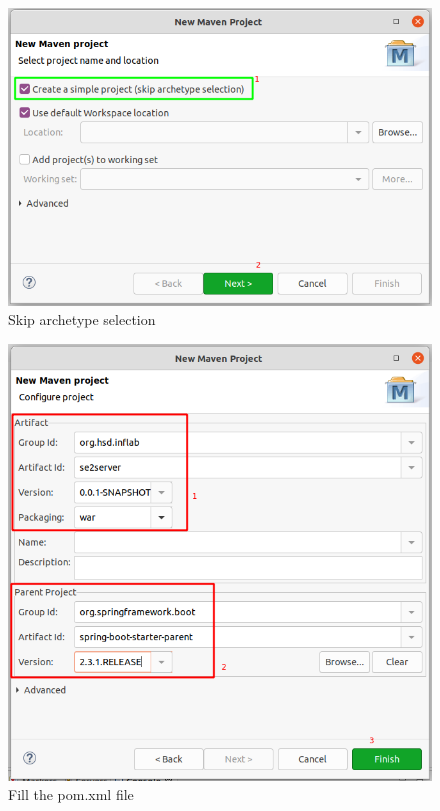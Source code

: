 \documentclass[11pt]{scrartcl}
\begin{document}
\newpage
\begin{figure}[!ht]
    \includegraphics[width=\linewidth]{images/eclipse03_create_maven2.png}
    \caption{Skip archetype selection}
    \label{fig:createmaven2}
\end{figure}

\newpage
\begin{figure}[!ht]
    \includegraphics[width=\linewidth]{images/eclipse04_create_maven3.png}
    \caption{Fill the pom.xml file}
    \label{fig:createmaven3}
\end{figure}
\end{document}
